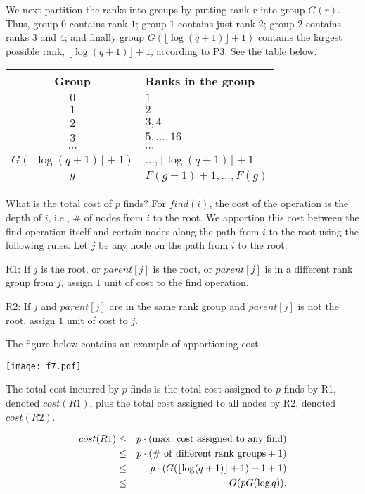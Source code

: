 \documentclass{article}
\begin{document}
\begin{itemize}
We next partition the ranks into groups by putting rank $r$ into group
$G(r)$. Thus, group $0$ contains rank $1$; group $1$ contains
just rank $2$; group $2$ contains ranks $3$ and $4$; and finally
group $G(\lfloor\log(q+1)\rfloor+1)$ contains the largest possible 
rank, $\lfloor\log(q+1)\rfloor+1$, according to P3. See the table below.

\begin{center}
\begin{tabular}{c|l}
Group & Ranks in the group\\\hline\hline
$0$ & $1$\\\hline
$1$ & $2$\\\hline
$2$ & $3,4$\\\hline
$3$ & $5,\ldots,16$\\\hline
$\cdots$ & $\cdots$\\\hline
$G(\lfloor\log(q+1)\rfloor+1)$ & $\ldots,\lfloor\log(q+1)\rfloor+1$\\
\hline\hline
$g$ & $F(g-1)+1,\ldots,F(g)$\\
\end{tabular}
\end{center}

What is the total cost of $p$ finds? For $find(i)$, the cost of the
operation is the depth of $i$, i.e., \# of nodes from $i$ to the root.
We apportion this cost between the find operation itself and certain
nodes along the path from $i$ to the root using the following rules.
Let $j$ be any node on the path from $i$ to the root.

R1: If $j$ is the root, or $parent[j]$ is the root, or $parent[j]$
is in a different rank group from $j$, assign $1$ unit of cost to the
find operation.

R2: If $j$ and $parent[j]$ are in the same rank group and
$parent[j]$ is not the root, assign $1$ unit of cost to $j$.

The figure below contains an example of apportioning cost.

\vskip 0.25cm
\begin{center}
\texttt{[image: f7.pdf]}
\end{center}

The total cost incurred by $p$ finds is the total cost assigned to
$p$ finds by R1, denoted $cost(R1)$, plus the total cost assigned to all 
nodes by R2, denoted $cost(R2)$.

\begin{eqnarray*}
cost(R1)&\le&p\cdot({\rm max.\ cost\ assigned\ to\ any\ find})\\
&\le&p\cdot({\rm \#\ of\ different\ rank\ groups}+1)\\
&\le&p\cdot(G(\lfloor\log(q+1)\rfloor+1)+1+1)\\
&\le&O(pG(\log q)).
\end{eqnarray*}


\end{itemize}
\end{document}
